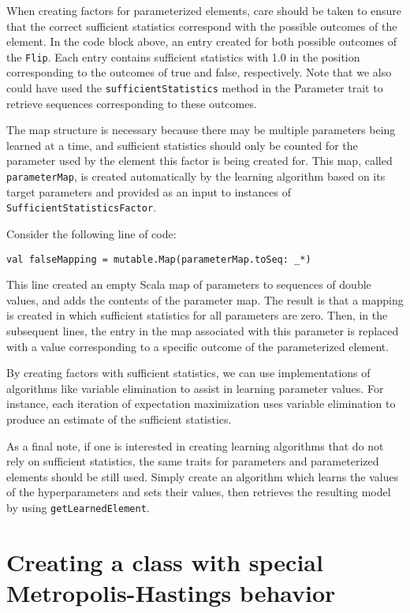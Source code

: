When creating factors for parameterized elements, care should be taken to ensure that the correct sufficient statistics correspond with the possible outcomes of the element. In the code block above, an entry created for both possible outcomes of the \texttt{Flip}. Each entry contains sufficient statistics with 1.0 in the position corresponding to the outcomes of true and false, respectively. Note that we also could have used the \texttt{sufficientStatistics} method in the Parameter trait to retrieve sequences corresponding to these outcomes.

The map structure is necessary because there may be multiple parameters being learned at a time, and sufficient statistics should only be counted for the parameter used by the element this factor is being created for. This map, called \texttt{parameterMap}, is created automatically by the learning algorithm based on its target parameters and provided as an input to instances of \texttt{SufficientStatisticsFactor}.

Consider the following line of code:

\begin{flushleft}
\texttt{val falseMapping = mutable.Map(parameterMap.toSeq: \_*)}
\end{flushleft}

This line created an empty Scala map of parameters to sequences of double values, and adds the contents of the parameter map. The result is that a mapping is created in which sufficient statistics for all parameters are zero. Then, in the subsequent lines, the entry in the map associated with this parameter is replaced with a value corresponding to a specific outcome of the parameterized element.

By creating factors with sufficient statistics, we can use implementations of algorithms like variable elimination to assist in learning parameter values. For instance, each iteration of expectation maximization uses variable elimination to produce an estimate of the sufficient statistics.

As a final note, if one is interested in creating learning algorithms that do not rely on sufficient statistics, the same traits for parameters and parameterized elements should be still used. Simply create an algorithm which learns the values of the hyperparameters and sets their values, then retrieves the resulting model by using \texttt{getLearnedElement}.


\section{Creating a class with special Metropolis-Hastings behavior}

